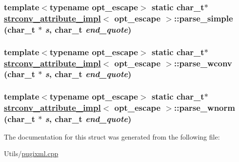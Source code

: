 \hypertarget{structstrconv__attribute__impl_8358dc980178e55c8669b9dcd04872d7}{
\subsubsection[parse\_\-simple]{\setlength{\rightskip}{0pt plus 5cm}template$<$typename opt\_\-escape$>$ static char\_\-t$\ast$ \hyperlink{structstrconv__attribute__impl}{strconv\_\-attribute\_\-impl}$<$ opt\_\-escape $>$::parse\_\-simple (char\_\-t $\ast$ {\em s}, char\_\-t {\em end\_\-quote})}}
\label{structstrconv__attribute__impl_8358dc980178e55c8669b9dcd04872d7}


\hypertarget{structstrconv__attribute__impl_2d39998b79896af7c53c5f3dc22a526b}{
\subsubsection[parse\_\-wconv]{\setlength{\rightskip}{0pt plus 5cm}template$<$typename opt\_\-escape$>$ static char\_\-t$\ast$ \hyperlink{structstrconv__attribute__impl}{strconv\_\-attribute\_\-impl}$<$ opt\_\-escape $>$::parse\_\-wconv (char\_\-t $\ast$ {\em s}, char\_\-t {\em end\_\-quote})}}
\label{structstrconv__attribute__impl_2d39998b79896af7c53c5f3dc22a526b}


\hypertarget{structstrconv__attribute__impl_9b7f8b1e860c5d022dbd29f9a89e9e27}{
\subsubsection[parse\_\-wnorm]{\setlength{\rightskip}{0pt plus 5cm}template$<$typename opt\_\-escape$>$ static char\_\-t$\ast$ \hyperlink{structstrconv__attribute__impl}{strconv\_\-attribute\_\-impl}$<$ opt\_\-escape $>$::parse\_\-wnorm (char\_\-t $\ast$ {\em s}, char\_\-t {\em end\_\-quote})}}
\label{structstrconv__attribute__impl_9b7f8b1e860c5d022dbd29f9a89e9e27}




The documentation for this struct was generated from the following file:\begin{CompactItemize}
\item 
Utils/\hyperlink{pugixml_8cpp}{pugixml.cpp}\end{CompactItemize}
